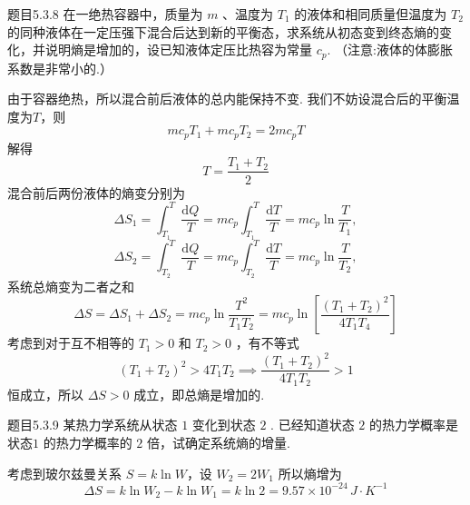 \begin{question}{题目5.3.8}
    在一绝热容器中，质量为 $m$ 、温度为 $T_1$ 的液体和相同质量但温度为 $T_2$ 的同种液体在一定压强下混合后达到新的平衡态，求系统从初态变到终态熵的变化，并说明熵是增加的，设已知液体定压比热容为常量 $c_p$. （注意:液体的体膨胀系数是非常小的.）
\end{question}
\begin{solution}
    由于容器绝热，所以混合前后液体的总内能保持不变. 我们不妨设混合后的平衡温度为$T$，则
    $$
        mc_pT_1 + mc_pT_2 = 2mc_pT
    $$
    解得
    $$
        T = \frac{T_1 + T_2}{2}
    $$
    混合前后两份液体的熵变分别为
    $$
        \Delta{S_1} = \int_{T_1}^{T} \frac{\mathrm{d}Q}{T}
        = mc_p\int_{T_1}^{T} \frac{\mathrm{d}T}{T}
        = mc_p\ln\frac{T}{T_1},
    $$
    $$
        \Delta{S_2} = \int_{T_2}^{T} \frac{\mathrm{d}Q}{T}
        = mc_p\int_{T_2}^{T} \frac{\mathrm{d}T}{T}
        = mc_p\ln\frac{T}{T_2},
    $$
    系统总熵变为二者之和
    $$
        \Delta{S} = \Delta{S_1} + \Delta{S_2}
        = mc_p\ln\frac{T^2}{T_1T_2}
        = mc_p\ln\left[\frac{(T_1 + T_2)^2}{4T_1T_4}\right]
    $$
    考虑到对于互不相等的 $T_1>0$ 和 $T_2>0$ ，有不等式
    $$
        (T_1+T_2)^2 > 4T_1T_2
        \implies
        \frac{(T_1+T_2)^2}{4T_1T_2} > 1
    $$
    恒成立，所以 $\Delta{S} > 0$ 成立，即总熵是增加的.
\end{solution}

\begin{question}{题目5.3.9}
    某热力学系统从状态 $1$ 变化到状态 $2$ . 已经知道状态 $2$ 的热力学概率是状态$1$ 的热力学概率的 $2$ 倍，试确定系统熵的增量.
\end{question}
\begin{solution}
    考虑到玻尔兹曼关系 $S = k \ln{W}$，设 $W_2 = 2W_1$ 所以熵增为
    $$
        \Delta{S} = k\ln{W_2} - k\ln{W_1} = k\ln{2} =9.57 \times 10 ^{-24} \,\si{J \cdot K^{-1}}
    $$
\end{solution}